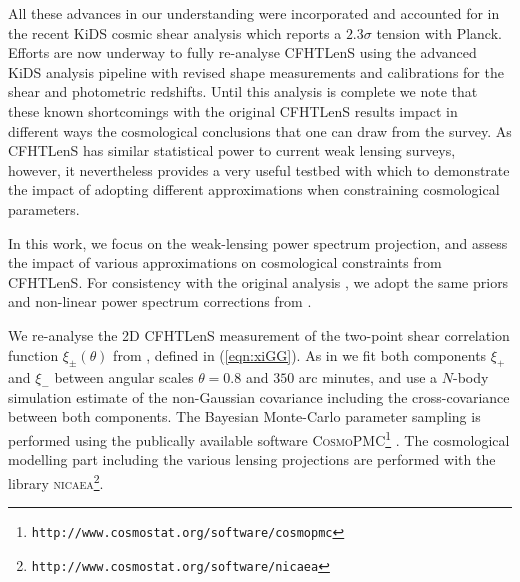 %
All these advances in our understanding were incorporated and accounted for in
the recent KiDS cosmic shear analysis \citep{KiDS-450} which reports a $2.3
\sigma$ tension with Planck.  Efforts are now underway to fully re-analyse
CFHTLenS using the advanced KiDS analysis pipeline with revised shape
measurements and calibrations for the shear and photometric redshifts. Until
this analysis is complete we note that these known shortcomings with the
original CFHTLenS results impact in different ways the cosmological conclusions
that one can draw from the survey. As CFHTLenS has similar statistical power
to current weak lensing surveys, however, it nevertheless provides a very
useful testbed with which to demonstrate the impact of adopting different
approximations when constraining cosmological parameters.


In this work, we focus on the weak-lensing power spectrum projection, and
assess the impact of various approximations on cosmological constraints from
CFHTLenS. For consistency with the original analysis
\citep{CFHTLenS-2pt-notomo}, we adopt the same priors and non-linear power
spectrum corrections from \cite{2003MNRAS.341.1311S}.

We re-analyse the 2D CFHTLenS measurement of the two-point shear correlation
function $\xi_\pm(\theta)$ from \cite{CFHTLenS-2pt-notomo}, defined in
(\ref{eqn:xiGG}). As in \cite{CFHTLenS-2pt-notomo} we fit both components
$\xi_+$ and $\xi_-$ between angular scales $\theta = 0.8$ and $350$ arc
minutes, and use a $N$-body simulation estimate of the non-Gaussian covariance
including the cross-covariance between both components. The Bayesian
Monte-Carlo parameter sampling is performed using the publically available
software \textsc{CosmoPMC}\footnote{\texttt{http://www.cosmostat.org/software/cosmopmc}}
\citep{WK09,KWR10}. The cosmological modelling part including the various
lensing projections are performed with the library
\textsc{nicaea}\footnote{\texttt{http://www.cosmostat.org/software/nicaea}}.

\label{ref:cosmo_results}


